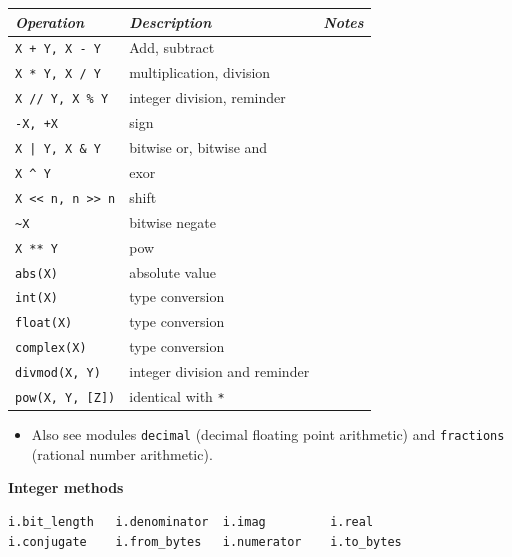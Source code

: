 \documentclass[9pt,a4wide]{extarticle}
\begin{document}
\begin{supertabular}{|l|p{12cm}|c|}\hline
{\em Operation}      & {\em Description}        &  {\em Notes} \\ \hline\hline

{\tt X + Y, X - Y}   & Add, subtract            &        \\ \hline
{\tt X * Y, X / Y}   & multiplication, division  &        \\ \hline
{\tt X // Y, X \% Y} & integer division, reminder  &        \\ \hline
{\tt -X, +X}         & sign                         &        \\ \hline
{\tt X | Y, X \& Y}   & bitwise or, bitwise and   &        \\ \hline
{\tt X \^{} Y}        &  exor                        &        \\ \hline
{\tt X << n, n >> n} &  shift                        &        \\ \hline
{\tt \~{}X}             & bitwise negate                      &        \\ \hline
{\tt X ** Y}         &  pow                        &        \\ \hline
{\tt abs(X)}         &  absolute value                        &        \\ \hline
{\tt int(X)}         &  type conversion                        &        \\ \hline
{\tt float(X)}         &  type conversion                        &        \\ \hline
{\tt complex(X)}         & type conversion        &        \\ \hline
{\tt divmod(X, Y)}       & integer division and reminder   &        \\ \hline
{\tt pow(X, Y, [Z])}     & identical with {\tt **}  &        \\ \hline
\end{supertabular}


\begin{itemize}
\item Also see modules {\tt decimal} (decimal floating point arithmetic) and
   {\tt fractions} (rational number arithmetic).
\end{itemize}


\bigskip
{\LARGE\bf Integer methods}

\begin{verbatim}
i.bit_length   i.denominator  i.imag         i.real         
i.conjugate    i.from_bytes   i.numerator    i.to_bytes    
\end{verbatim}
\end{document}
